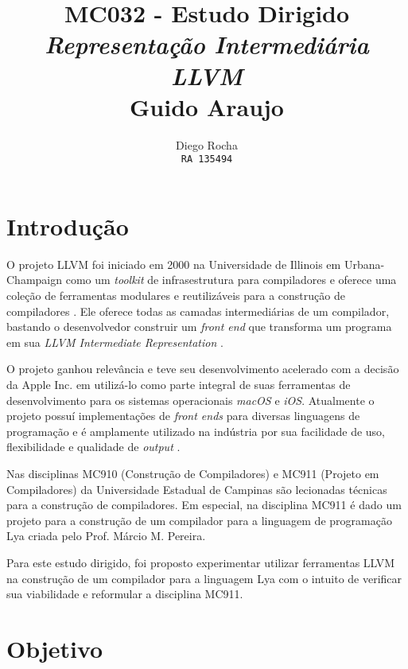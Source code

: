 \documentclass[11pt, oneside, titlepage]{report}
\title{%
    MC032 - Estudo Dirigido \\
    \large \textit{Representação Intermediária LLVM} \\
    \small Guido Araujo
  }
\author{
    Diego Rocha \\
     \texttt{RA 135494}
  }
\begin{document}
    \begin{titlepage}

      \maketitle

    \end{titlepage}

    \tableofcontents

    \chapter{Introdução}

      O projeto LLVM foi iniciado em 2000 na Universidade de Illinois em Urbana-Champaign como um \textit{toolkit} de
      infrasestrutura para compiladores e oferece uma coleção de ferramentas modulares e reutilizáveis para a construção
      de compiladores \cite{llvm}. Ele oferece todas as camadas intermediárias de um compilador, bastando o
      desenvolvedor construir um \textit{front end} que transforma um programa em sua
      \textit{LLVM Intermediate Representation} \cite{llvmref}.

      O projeto ganhou relevância e teve seu desenvolvimento acelerado com a decisão da Apple Inc. em utilizá-lo como
      parte integral de suas ferramentas de desenvolvimento para os sistemas operacionais \textit{macOS} e \textit{iOS}.
      Atualmente o projeto possuí implementações de \textit{front ends} para diversas linguagens de programação e é
      amplamente utilizado na indústria por sua facilidade de uso, flexibilidade e qualidade de \textit{output}
      \cite{llvmfeatures}.

      Nas disciplinas MC910 (Construção de Compiladores) e MC911 (Projeto em Compiladores) da Universidade Estadual de
      Campinas são lecionadas técnicas para a construção de compiladores. Em especial, na disciplina MC911 é dado um
      projeto para a construção de um compilador para a linguagem de programação Lya \cite{lyagrammar} criada pelo
      Prof. Márcio M. Pereira.

      Para este estudo dirigido, foi proposto experimentar utilizar ferramentas LLVM na
      construção de um compilador para a linguagem Lya com o intuito de verificar sua viabilidade e reformular a
      disciplina MC911.

    \chapter{Objetivo}
\end{document}

